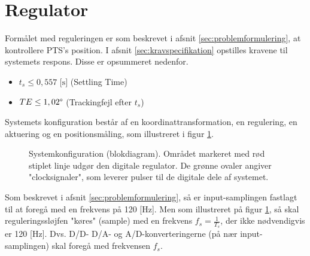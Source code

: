 \section{Regulator}
\label{sec:kontrollerdeign}
% 

Formålet med reguleringen er som beskrevet i afsnit \ref{sec:problemformulering},
at kontrollere PTS's position.
I afsnit \ref{sec:kravspecifikation} opstilles kravene til systemets respons.
Disse er opsummeret nedenfor.
\begin{itemize}
\itemsep1pt
\item \(t_{s} \leq 0,557 \text{ [s]}\) (Settling Time)
\item \(TE \leq 1,02\degree\) (Trackingfejl efter \(t_s\))
\end{itemize}

Systemets konfiguration består af en koordinattransformation,
en regulering, en aktuering og en positionsmåling, som illustreret
i figur \ref{fig:digitalkontroller1}.
\begin{figure}[!th]
\centering
\begin{tikzpicture}[scale=0.8, every node/.style={scale=0.8}, node distance=2.6cm, =>latex']

\end{tikzpicture}
\caption[Systemkonfiguration]{Systemkonfiguration (blokdiagram).
	Området markeret med rød stiplet linje udgør den digitale regulator.
	De grønne ovaler angiver "clocksignaler", som leverer pulser til de digitale dele af systemet.}
\label{fig:digitalkontroller1}
\end{figure}

Som beskrevet i afsnit \ref{sec:problemformulering},
så er input-samplingen fastlagt til at foregå med en frekvens på 120 [Hz].
Men som illustreret på figur \ref{fig:digitalkontroller1}, så skal reguleringssløjfen
"køres" (sample) med en frekvens \(f_s=\frac{1}{T_s}\), der ikke nødvendigvis er 120 [Hz].
Dvs. D/D- D/A- og A/D-konverteringerne (på nær input-samplingen) skal foregå med frekvensen \(f_s\).

